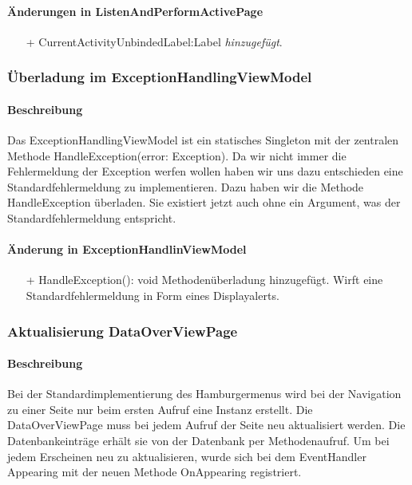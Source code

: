\documentclass[a4paper,12pt]{article}
\begin{document}
\paragraph{Änderungen in ListenAndPerformActivePage}
\begin{itemize}
	\item[+] CurrentActivityUnbindedLabel:Label \textit{hinzugefügt}.
\end{itemize}

\subsubsection{Überladung im ExceptionHandlingViewModel}
\paragraph{Beschreibung}
Das ExceptionHandlingViewModel ist ein statisches Singleton mit der zentralen Methode HandleException(error: Exception). Da wir nicht immer die Fehlermeldung der Exception werfen wollen haben wir uns dazu entschieden eine Standardfehlermeldung zu implementieren. Dazu haben wir die Methode HandleException überladen. Sie existiert jetzt auch ohne ein Argument, was der Standardfehlermeldung entspricht.
\paragraph{Änderung in ExceptionHandlinViewModel}
\begin{itemize}
	\item[+] HandleException(): void  Methodenüberladung hinzugefügt. Wirft eine Standardfehlermeldung in Form eines Displayalerts.
\end{itemize}

\subsubsection{Aktualisierung DataOverViewPage}
\paragraph{Beschreibung}
Bei der Standardimplementierung des Hamburgermenus wird bei der Navigation zu einer Seite nur beim ersten Aufruf eine Instanz erstellt. Die DataOverViewPage muss bei jedem Aufruf der Seite neu aktualisiert werden. Die Datenbankeinträge erhält sie von der Datenbank per Methodenaufruf. Um bei jedem Erscheinen neu zu aktualisieren, wurde sich bei dem EventHandler Appearing mit der neuen Methode OnAppearing registriert.
\end{document}
